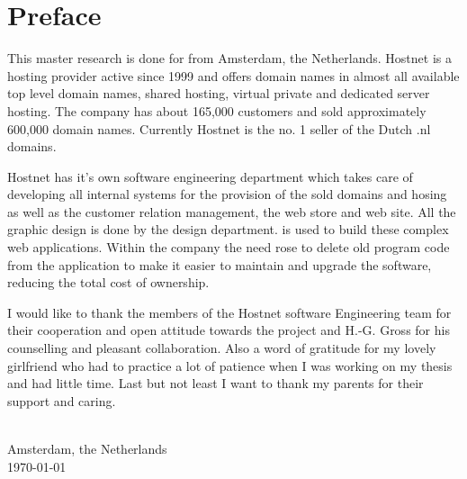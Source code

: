 \chapter{Preface}
\label{ch:preface}
This master research is done for  from Amsterdam, the Netherlands. Hostnet is a hosting provider active since 1999 and offers domain names in almost all available top level domain names, shared hosting, virtual private and dedicated server hosting. The company has about 165,000 customers and sold approximately 600,000 domain names. Currently Hostnet is the no. 1 seller of the Dutch .nl domains.

Hostnet has it's own software engineering department which takes care of developing all internal systems for the provision of the sold domains and hosing as well as the customer relation management, the web store and web site. All the graphic design is done by the design department.  is used to build these complex web applications. Within the company the need rose to delete old program code from the application to make it easier to maintain and upgrade the software, reducing the total cost of ownership. 

I would like to thank the members of the Hostnet software Engineering team for their cooperation and open attitude towards the project and H.-G. Gross for his counselling and pleasant collaboration. Also a word of gratitude for my lovely girlfriend who had to practice a lot of patience when I was working on my thesis and had little time. Last but not least I want to thank my parents for their support and caring.
\vskip1cm
\begin{flushright}
\theauthor\\
Amsterdam, the Netherlands \\
\today\\
\end{flushright}
